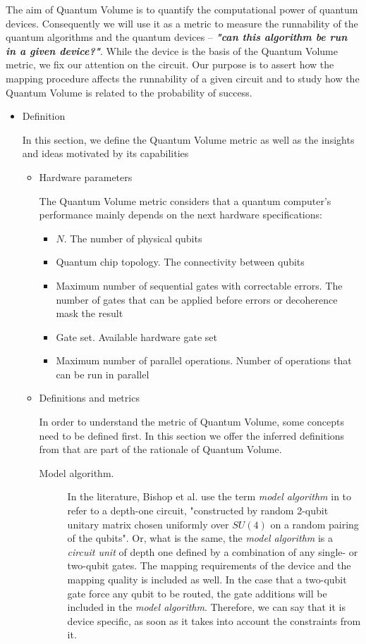 The aim of Quantum Volume is to quantify the computational power of quantum devices. 
Consequently we will use it as a metric to measure the runnability of the quantum algorithms and the quantum devices -- \emph{\textbf{"can this algorithm be run in a given device?"}}.
While the device is the basis of the Quantum Volume metric, we fix our attention on the circuit.
Our purpose is to assert how the mapping procedure affects the runnability of a given circuit and to study how the Quantum Volume is related to the probability of success.

\begin{itemize}
\item Definition
\label{sec:orgc3accbc}

In this section, we define the Quantum Volume metric as well as the insights and ideas motivated by its capabilities

\begin{itemize}
\item Hardware parameters
\label{sec:org0b33216}

The Quantum Volume metric considers that a quantum computer's performance mainly depends on the next hardware specifications:

\begin{itemize}
\item \(N\). The number of physical qubits
\item Quantum chip topology. The connectivity between qubits
\item Maximum number of sequential gates with correctable errors. The number of gates that can be applied before errors or decoherence mask the result
\item Gate set. Available hardware gate set
\item Maximum number of parallel operations. Number of operations that can be run in parallel
\end{itemize}

\item Definitions and metrics
\label{sec:orga81b689}

In order to understand the metric of Quantum Volume, some concepts need to be defined first. 
In this section we offer the inferred definitions from \cite{Bishop_2017,Moll_2018} that are part of the rationale of Quantum Volume.


\begin{description}
\item[{Model algorithm.}] In the literature, Bishop et al. use the term \emph{model algorithm} in \cite{Bishop_2017} to refer to a depth-one circuit, "constructed by random 2-qubit unitary matrix chosen uniformly over \(SU (4)\) on a random pairing of the qubits". Or, what is the same, the \emph{model algorithm} is a \emph{circuit unit} of depth one defined by a combination of any single- or two-qubit gates. The mapping requirements of the device and the mapping quality is included as well. In the case that a two-qubit gate force any qubit to be routed, the gate additions will be included in the \emph{model algorithm}. Therefore, we can say that it is device specific, as soon as it takes into account the constraints from it.
\end{description}


\end{itemize}
\end{itemize}
